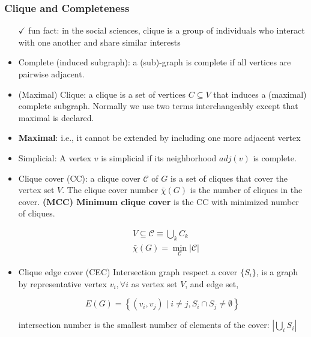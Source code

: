 \subsubsection*{Clique and Completeness}
\begin{itemize}
      \tightlist
      \item[\(\checkmark\)] fun fact: in the social sciences, clique is a group of individuals who interact with one another and share similar interests
      \item Complete (induced subgraph): a (sub)-graph is complete if all vertices are pairwise adjacent.
      \item (Maximal) Clique: a clique is a set of vertices \(C \subseteq V\) that induces a (maximal) complete subgraph. Normally we use two terms interchangeably except that maximal is declared.
      \item \textbf{Maximal}: i.e., it cannot be extended by including one more adjacent vertex
      \item Simplicial: A vertex \(v\) is simplicial if its neighborhood \(adj(v)\) is complete.
      \item Clique cover (CC): a clique cover \(\mathscr C\) of \(G\) is a set of
            cliques that cover the vertex set \(V\). The clique cover number
            \(\bar \chi (G)\) is the number of cliques in the cover. \textbf{(MCC) Minimum clique cover} is the CC with minimized number of cliques.

            \begin{equation}
                  \begin{aligned}
                         & V \subseteq \mathscr C \equiv \bigcup_k C_k    \\
                         & \bar \chi (G) = \min_{\mathscr C} |\mathscr C|
                  \end{aligned}
            \end{equation}
      \item Clique edge cover (CEC) Intersection graph respect a cover \(\{S_i\}\), is a graph by representative vertex \(v_i, \forall i\) as vertex set \(V\), and edge set,

            \[E(G)=\left\{(v_{i}, v_{j}) \mid i \neq j, S_{i} \cap S_{j} \neq \emptyset \right\}\]

            intersection number is the smallest number of elements of the cover: \(|\bigcup_i S_i|\)
\end{itemize}



